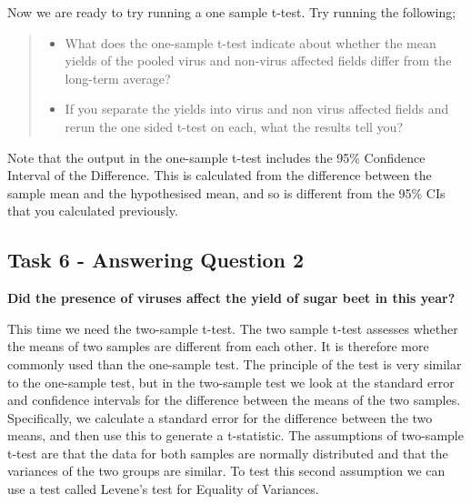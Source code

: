 \documentclass[
]{book}
\newenvironment{Shaded}{\begin{snugshade}}{\end{snugshade}}
\newcommand{\AttributeTok}[1]{\textcolor[rgb]{0.13,0.29,0.53}{#1}}
\newcommand{\CommentTok}[1]{\textcolor[rgb]{0.56,0.35,0.01}{\textit{#1}}}
\newcommand{\FloatTok}[1]{\textcolor[rgb]{0.00,0.00,0.81}{#1}}
\newcommand{\FunctionTok}[1]{\textcolor[rgb]{0.13,0.29,0.53}{\textbf{#1}}}
\newcommand{\NormalTok}[1]{#1}
\newcommand{\OtherTok}[1]{\textcolor[rgb]{0.56,0.35,0.01}{#1}}
\newcommand{\SpecialCharTok}[1]{\textcolor[rgb]{0.81,0.36,0.00}{\textbf{#1}}}
\providecommand{\tightlist}{%
  \setlength{\itemsep}{0pt}\setlength{\parskip}{0pt}}
\begin{document}
Now we are ready to try running a one sample t-test. Try running the following;

\begin{Shaded}
\end{Shaded}

\begin{quote}
\begin{itemize}
\tightlist
\item
  What does the one-sample t-test indicate about whether the mean yields of the pooled virus and non-virus affected fields differ from the long-term average?
\item
  If you separate the yields into virus and non virus affected fields and rerun the one sided t-test on each, what the results tell you?
\end{itemize}
\end{quote}

Note that the output in the one-sample t-test includes the 95\% Confidence Interval of the Difference. This is calculated from the difference between the sample mean and the hypothesised mean, and so is different from the 95\% CIs that you calculated previously.

\hypertarget{levene-test}{%
\subsection{Task 6 - Answering Question 2}\label{levene-test}}

\textbf{Did the presence of viruses affect the yield of sugar beet in this year?}

This time we need the two-sample t-test. The two sample t-test assesses whether the means of two samples are different from each other. It is therefore more commonly used than the one-sample test. The principle of the test is very similar to the one-sample test, but in the two-sample test we look at the standard error and confidence intervals for the difference between the means of the two samples. Specifically, we calculate a standard error for the difference between the two means, and then use this to generate a t-statistic. The assumptions of two-sample t-test are that the data for both samples are normally distributed and that the variances of the two groups are similar. To test this second assumption we can use a test called Levene's test for Equality of Variances.
\end{document}
